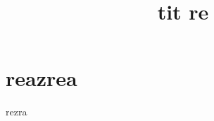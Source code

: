 \documentclass{article}
\title{tit re}
\begin{document}
\maketitle
\section{reazrea}{rezra}
\end{document}
